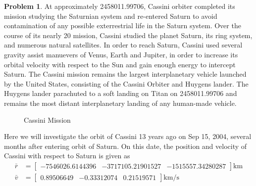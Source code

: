 \documentclass[10pt]{article}
\theoremstyle{definition}
\newtheorem{prob}{Problem}[section]
\begin{document}
\clearpage\newpage
\begin{prob}
    At approximately \SI{2458011.99706}{\julianday}, Cassini orbiter completed its mission studying the Saturnian system and re-entered Saturn to avoid contamination of any possible exterrestrial life in the Saturn system.
    Over the course of its nearly \SI{20}{\year} mission, Cassini studied the planet Saturn, its ring system, and numerous natural satellites. 
    In order to reach Saturn, Cassini used several gravity assist manuevers of Venus, Earth and Jupiter, in order to increase its orbital velocity with respect to the Sun and gain enough energy to intercept Saturn. 
    The Cassini mission remains the largest interplanetary vehicle launched by the United States, consisting of the Cassini Orbiter and Huygens lander.
    The Huygens lander parachuted to a soft landing on Titan on \SI{2458011.99706}{\julianday} and remains the most distant interplanetary landing of any human-made vehicle.
    \begin{figure}[htbp]
        \centering
       \caption{Cassini Mission} 
    \end{figure}

    Here we will investigate the orbit of Cassini 13 years ago on Sep 15, 2004, several months after entering orbit of Saturn.
    On this date, the position and velocity of Cassini with respect to Saturn is given as 
    \begin{align*}
    \bar{r} &= \begin{bmatrix} -7546026.6144396 & -3717105.21901527 & -1515557.34280287\end{bmatrix} \si{\kilo\meter} \\
    \bar{v} &= \begin{bmatrix}  0.89506649 & -0.33312074  & 0.21519571 \end{bmatrix} \si{\kilo\meter\per\second}
    \end{align*}
\end{prob}
\end{document}
